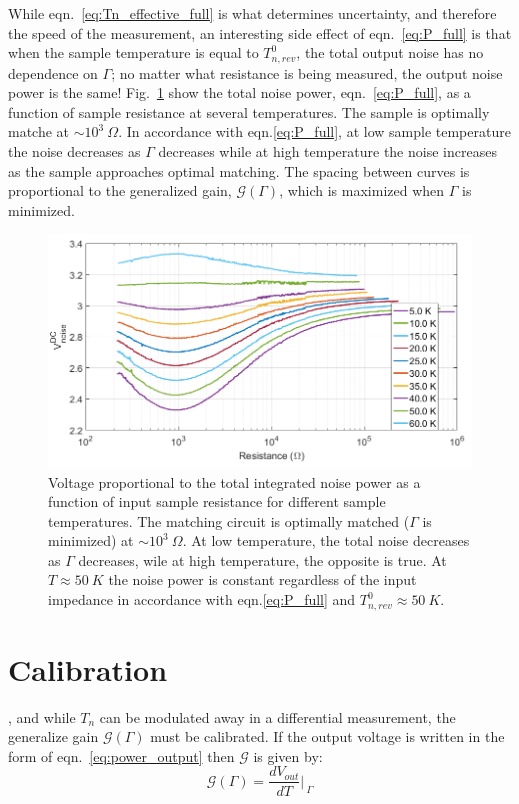 While eqn.~\ref{eq:Tn_effective_full} is what determines uncertainty, and therefore the speed of the measurement, an interesting side effect of eqn.~\ref{eq:P_full} is that when the sample temperature is equal to $T_{n,rev}^0$, the total output noise has no dependence on $\Gamma$; no matter what resistance is being measured, the output noise power is the same! Fig.~\ref{fig:JNT_Vn_vs_R} show the total noise power, eqn.~\ref{eq:P_full}, as a function of sample resistance at several temperatures. The sample is optimally matche at ${\sim}10^3~\Omega$. In accordance with eqn.\ref{eq:P_full}, at low sample temperature the noise decreases as $\Gamma$ decreases while at high temperature the noise increases as the sample approaches optimal matching. The spacing between curves is proportional to the generalized gain, $\mathcal{G}(\Gamma)$, which is maximized when $\Gamma$ is minimized.
\begin{figure}
\centering
\includegraphics[width=120mm]{figures/Johnson_noise_thermometry/Vn_vs_R.png}
\caption{Voltage proportional to the total integrated noise power as a function of input sample resistance for different sample temperatures. The matching circuit is optimally matched ($\Gamma$ is minimized) at ${\sim}10^3~\Omega$. At low temperature, the total noise decreases as $\Gamma$ decreases, wile at high temperature, the opposite is true. At $T\approx50~K$ the noise power is constant regardless of the input impedance in accordance with eqn.\ref{eq:P_full} and $T_{n,rev}^0\approx50~K$.}
\label{fig:JNT_Vn_vs_R}
\end{figure}

\section{Calibration}
, and while $T_n$ can be modulated away in a differential measurement, the generalize gain $\mathcal{G}(\Gamma)$ must be calibrated. If the output voltage is written in the form of eqn.~\ref{eq:power_output} then $\mathcal{G}$ is given by:
\begin{equation}
\mathcal{G}(\Gamma) = \frac{dV_{out}}{dT}\bigg\rvert_{~\Gamma}
\end{equation}

